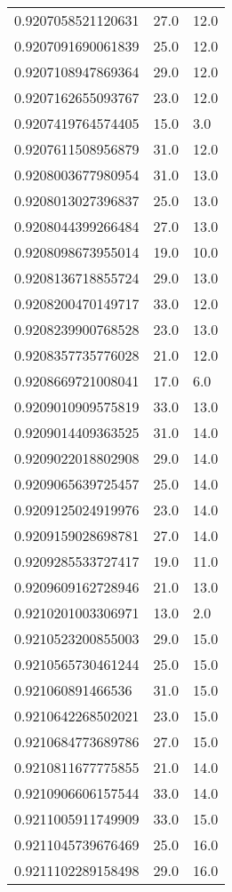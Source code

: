 \begin{center}
\begin{supertabular}[H]{p{0.30\textwidth}p{0.05\textwidth}p{0.05\textwidth}}
0.9207058521120631 & 27.0 & 12.0 \\ 
0.9207091690061839 & 25.0 & 12.0 \\ 
0.9207108947869364 & 29.0 & 12.0 \\ 
0.9207162655093767 & 23.0 & 12.0 \\ 
0.9207419764574405 & 15.0 & 3.0 \\ 
0.9207611508956879 & 31.0 & 12.0 \\ 
0.9208003677980954 & 31.0 & 13.0 \\ 
0.9208013027396837 & 25.0 & 13.0 \\ 
0.9208044399266484 & 27.0 & 13.0 \\ 
0.9208098673955014 & 19.0 & 10.0 \\ 
0.9208136718855724 & 29.0 & 13.0 \\ 
0.9208200470149717 & 33.0 & 12.0 \\ 
0.9208239900768528 & 23.0 & 13.0 \\ 
0.9208357735776028 & 21.0 & 12.0 \\ 
0.9208669721008041 & 17.0 & 6.0 \\ 
0.9209010909575819 & 33.0 & 13.0 \\ 
0.9209014409363525 & 31.0 & 14.0 \\ 
0.9209022018802908 & 29.0 & 14.0 \\ 
0.9209065639725457 & 25.0 & 14.0 \\ 
0.9209125024919976 & 23.0 & 14.0 \\ 
0.9209159028698781 & 27.0 & 14.0 \\ 
0.9209285533727417 & 19.0 & 11.0 \\ 
0.9209609162728946 & 21.0 & 13.0 \\ 
0.9210201003306971 & 13.0 & 2.0 \\ 
0.9210523200855003 & 29.0 & 15.0 \\ 
0.9210565730461244 & 25.0 & 15.0 \\ 
0.921060891466536 & 31.0 & 15.0 \\ 
0.9210642268502021 & 23.0 & 15.0 \\ 
0.9210684773689786 & 27.0 & 15.0 \\ 
0.9210811677775855 & 21.0 & 14.0 \\ 
0.9210906606157544 & 33.0 & 14.0 \\ 
0.9211005911749909 & 33.0 & 15.0 \\ 
0.9211045739676469 & 25.0 & 16.0 \\ 
0.9211102289158498 & 29.0 & 16.0 \\ 

\end{supertabular}
\end{center}
